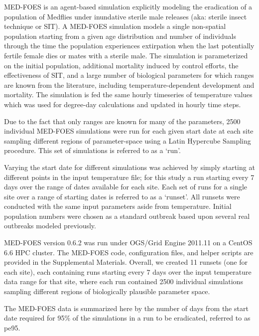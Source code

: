 \documentclass[10pt,a4paper,twocolumn]{article}
\begin{document}
MED-FOES\cite{manoukis_computer_2014,manoukis_agent-based_2014} is 
an agent-based simulation explicitly modeling the eradication of a population of Medflies 
under inundative sterile male releases (aka: sterile insect technique or SIT).
A MED-FOES simulation models a single non-spatial population starting from a given age distribution 
and number of individuals through the time the population experiences extirpation when the last 
potentially fertile female dies or mates with a sterile male.
The simulation is parameterized on the initial population, additional mortality induced by control efforts,
the effectiveness of SIT, and a large number of biological parameters for which ranges are known from 
the literature, including temperature-dependent development and mortality.
The simulation is fed the same hourly timeseries of temperature values which was used for degree-day calculations
and updated in hourly time steps.

Due to the fact that only ranges are known for many of the parameters,
2500 individual MED-FOES simulations were run for each given start date at each site 
sampling different regions of parameter-space using a Latin Hypercube Sampling\cite{10.2307/1403510} procedure.
This set of simulations is referred to as a `run'.

Varying the start date for different simulations was achieved by simply 
starting at different points in the input temperature file; 
for this study a run starting every 7 days over the range of dates available for each site.
Each set of runs for a single site over a range of starting dates is referred to as a `runset'.
All runsets were conducted with the same input parameters aside from temperature.
Initial population numbers were chosen as a standard outbreak based upon several real 
outbreaks modeled previously\cite{manoukis_agent-based_2014}.

MED-FOES version 0.6.2 was run under OGS/Grid Engine 2011.11 on a CentOS 6.6 HPC cluster.
The MED-FOES code, configuration files, and helper scripts are provided in the Supplemental Materials.
Overall, we created 11 runsets (one for each site), 
each containing runs starting every 7 days over the input temperature data range for that site,
where each run contained 2500 individual simulations sampling different regions of 
biologically plausible parameter space.

The MED-FOES data is summarized here by the number of days from the start date required for
95\% of the simulations in a run to be eradicated, referred to as pe95.
\end{document}
